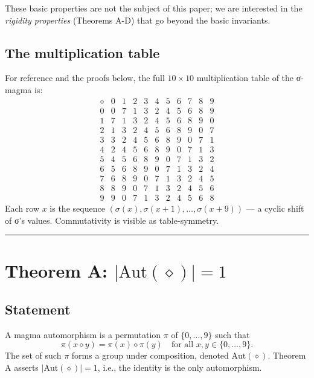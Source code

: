\documentclass[11pt,reqno]{amsart}
\theoremstyle{plain}
\theoremstyle{definition}
\begin{document}
These basic properties are not the subject of this paper; we are interested in the \textit{rigidity properties} (Theorems A-D) that go beyond the basic invariants.

\subsection{The multiplication table}

For reference and the proofs below, the full $10 \times 10$ multiplication table of the σ-magma is:
$$
\begin{array}{c|cccccccccc}
\diamond & 0 & 1 & 2 & 3 & 4 & 5 & 6 & 7 & 8 & 9 \\
\hline
0 & 0 & 7 & 1 & 3 & 2 & 4 & 5 & 6 & 8 & 9 \\
1 & 7 & 1 & 3 & 2 & 4 & 5 & 6 & 8 & 9 & 0 \\
2 & 1 & 3 & 2 & 4 & 5 & 6 & 8 & 9 & 0 & 7 \\
3 & 3 & 2 & 4 & 5 & 6 & 8 & 9 & 0 & 7 & 1 \\
4 & 2 & 4 & 5 & 6 & 8 & 9 & 0 & 7 & 1 & 3 \\
5 & 4 & 5 & 6 & 8 & 9 & 0 & 7 & 1 & 3 & 2 \\
6 & 5 & 6 & 8 & 9 & 0 & 7 & 1 & 3 & 2 & 4 \\
7 & 6 & 8 & 9 & 0 & 7 & 1 & 3 & 2 & 4 & 5 \\
8 & 8 & 9 & 0 & 7 & 1 & 3 & 2 & 4 & 5 & 6 \\
9 & 9 & 0 & 7 & 1 & 3 & 2 & 4 & 5 & 6 & 8
\end{array}
$$
Each row $x$ is the sequence $(\sigma(x), \sigma(x+1), \ldots, \sigma(x+9))$ --- a cyclic shift of σ's values. Commutativity is visible as table-symmetry.

\medskip\hrule\medskip

\section{Theorem A: $|\mathrm{Aut}(\diamond)| = 1$}

\subsection{Statement}

A magma automorphism is a permutation $\pi$ of $\{0, \ldots, 9\}$ such that
$$
\pi(x \diamond y) = \pi(x) \diamond \pi(y) \quad \text{for all } x, y \in \{0, \ldots, 9\}.
$$
The set of such $\pi$ forms a group under composition, denoted $\mathrm{Aut}(\diamond)$. Theorem A asserts $|\mathrm{Aut}(\diamond)| = 1$, i.e., the identity is the only automorphism.
\end{document}
